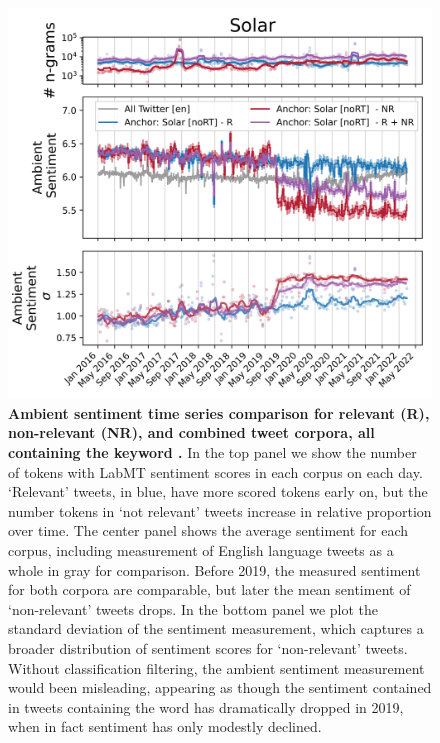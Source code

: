 \begin{figure}[tp!]
  \centering	
    \includegraphics[width=0.98\columnwidth]{figures/Solar_sentiment_2016-01-01_2022-03-15.png}  
  \caption{
    \textbf{Ambient sentiment time series comparison for relevant  (R), non-relevant (NR), and combined tweet corpora, all containing the keyword .}
    In the top panel we show the number of tokens with LabMT \cite{dodds2015human} sentiment scores in each corpus on each day.
    `Relevant' tweets, in blue, have more scored tokens early on,
    but the number tokens in `not relevant' tweets increase in relative proportion over time.
    The center panel shows the average sentiment for each corpus, including measurement of English language tweets as a whole in gray for comparison. 
    Before 2019, the measured sentiment for both corpora are comparable, but later the mean sentiment of `non-relevant' tweets drops. 
    In the bottom panel we plot the standard deviation of the sentiment measurement, which captures a broader distribution of sentiment scores for  `non-relevant' tweets.
    Without classification filtering, the ambient sentiment measurement would been misleading, appearing as though the sentiment contained in tweets containing the word  has dramatically dropped in 2019, when in fact sentiment has only modestly declined. 
  }
\end{figure}


